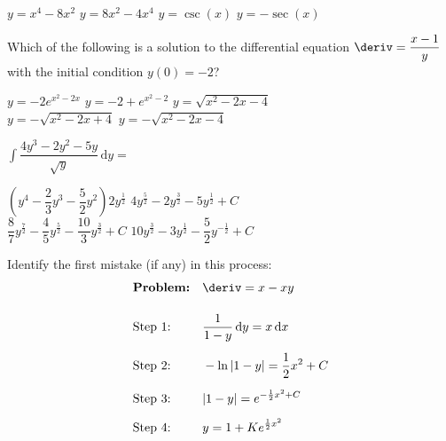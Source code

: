 \begin{questions}
    \begin{oneparchoices}
        \choice $y = x^4 - 8x^2$
        \choice $y = 8x^2 - 4x^4$
        \choice $y = \csc (x)$
        \choice $y = -\sec (x)$
    \end{oneparchoices} \par \horizontalline

    \question Which of the following is a solution to the differential equation $\deriv = \dfrac{x - 1}{y}$ with the initial condition $y(0) = -2$? \\
    
    \begin{oneparchoices}
        \choice $y  = -2e^{x^2 - 2x}$
        \choice $y = -2 + e^{x^2 - 2}$
        \choice $y = \sqrt{x^2 - 2x - 4}$ \\[11pt]
        \makebox[0.17\textwidth] \choice $y = -\sqrt{x^2 - 2x + 4}$
        \makebox[0.2\textwidth] \choice $y = -\sqrt{x^2 - 2x - 4}$
    \end{oneparchoices} \par \horizontalline

    \question $\int \dfrac{4y^3 - 2y^2 - 5y}{\sqrt{y}} \,\mathrm{d}y = $ \\

    \begin{oneparchoices}
        \choice $\left(y^4 - \dfrac{2}{3}y^3 - \dfrac{5}{2}y^2\right)2y^{\frac{1}{2}}$ 
        \makebox[0.3\textwidth] \choice $4y^{\frac{5}{2}} - 2y^{\frac{3}{2}} - 5y^{\frac{1}{2}} + C$ \\[11pt]
        \makebox[0.035\textwidth] \choice $\dfrac{8}{7}y^{\frac{7}{2}} - \dfrac{4}{5}y^{\frac{5}{2}} - \dfrac{10}{3}y^{\frac{3}{2}} + C$
        \makebox[0.285\textwidth] \choice $10y^{\frac{3}{2}} - 3y^{\frac{1}{2}} - \dfrac{5}{2}y^{-\frac{1}{2}} + C$
    \end{oneparchoices} \par \horizontalline

    \question Identify the first mistake (if any) in this process: \begin{align*}
        & \textbf{Problem:} && \deriv = x - xy\\[11pt]
        & \text{Step 1:} && \dfrac{1}{1 - y} \,\mathrm{d}y = x \,\mathrm{d}x \\[5.5pt]
        & \text{Step 2:} && -\ln |1 - y| = \dfrac{1}{2}x^2 + C \\[5.5pt]
        & \text{Step 3:} && |1 - y| = e^{-\frac{1}{2}x^2 + C} \\[5.5pt]
        & \text{Step 4:} && y = 1 + Ke^{\frac{1}{2}x^2}
    \end{align*}


\end{questions}
